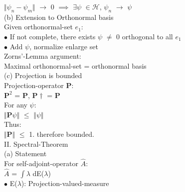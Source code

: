 \documentclass[a4paper, 10pt, onepage]{elegantbook}
\begin{document}
{    $\Vert \psi_n - \psi_m \Vert$ $\longrightarrow$ 0 $\implies$ $\exists \psi$ $\in \mathscr H$, $\psi_n$ $\longrightarrow$ $\psi$ \\
   

(b) Extension to Orthonormal basis  \\
  

Given orthonormal-set $e_1$:  \\
  
$\bullet$ If not complete, there exists $\psi$ $\neq$ 0 orthogonal to all $e_1$  \\
  
$\bullet$ Add $\psi$, normalize enlarge set \\ 

Zorns'-Lemma argument:  \\

Maximal orthonormal-set = orthonormal basis  \\

(c) Projection is bounded  \\

Projection-operator $\mathbf P$:  \\  
    
    $\mathbf P^2$ = $\mathbf P$, $\mathbf {P}\dagger$ = $\mathbf P$ \\ 
    
For any $\psi$: \\  
    
    $\Vert \mathbf P \psi \Vert$ $\leq$ $\Vert \psi \Vert$ \\ 
    
    Thus: \\
 
        $\Vert \mathbf P \Vert$ $\leq$ 1. therefore bounded. \\

II. Spectral-Theorem \\
 
(a) Statement \\ 

For self-adjoint-operator $\hat A$:  \\
  
    $\hat A$ = $\int \lambda$ dE($\lambda$)  \\
  
$\bullet$ E($\lambda$): Projection-valued-measure  \\
  
}
\end{document}
